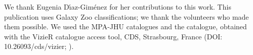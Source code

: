 \documentclass{aa}
\newcommand{\diazg}{D\'{\i}az-Gim\'enez}
\begin{document}
\begin{acknowledgements}
We thank Eugenia \diazg{} for her contributions to this work. This publication uses Galaxy Zoo classifications; we thank the volunteers who made them possible. We used the MPA-JHU catalogues and the \citet{Simard2011} catalogue, obtained with the VizieR catalogue access tool, CDS, Strasbourg, France (DOI: 10.26093/cds/vizier; \citealt{Ochsenbein+00}).




\end{acknowledgements}
\end{document}

